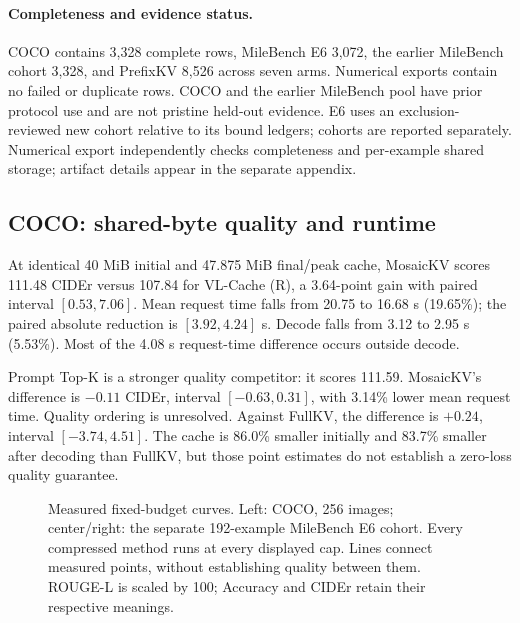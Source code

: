 \paragraph{Completeness and evidence status.}
COCO contains 3,328 complete rows, MileBench E6 3,072, the earlier MileBench
cohort 3,328, and PrefixKV 8,526 across seven arms. Numerical exports contain
no failed or duplicate rows. COCO and the earlier MileBench pool have prior
protocol use and are not pristine held-out evidence. E6 uses an
exclusion-reviewed new cohort relative to its bound ledgers; cohorts are
reported separately. Numerical export independently checks completeness and
per-example shared storage; artifact details appear in the separate appendix.

\subsection{COCO: shared-byte quality and runtime}
\begin{table}[t]
\caption{COCO at 40 MiB. Storage is MiB; times are seconds. FullKV is a
quality reference. R denotes a local reimplementation.}
\label{tab:coco-measured}
\centering\small\resizebox{\columnwidth}{!}{}
\end{table}

At identical 40 MiB initial and 47.875 MiB final/peak cache,
MosaicKV scores 111.48 CIDEr versus 107.84 for VL-Cache (R), a 3.64-point
gain with paired interval $[0.53,7.06]$. Mean request time falls from
20.75 to 16.68 s (19.65\%); the paired absolute reduction is
$[3.92,4.24]$ s. Decode falls from 3.12 to 2.95 s (5.53\%).
Most of the 4.08 s request-time difference occurs outside decode.

Prompt Top-K is a stronger quality competitor: it scores 111.59.
MosaicKV's difference is $-0.11$ CIDEr, interval $[-0.63,0.31]$, with
3.14\% lower mean request time. Quality ordering is unresolved.
Against FullKV, the difference is $+0.24$, interval $[-3.74,4.51]$.
The cache is 86.0\% smaller initially and 83.7\% smaller after decoding than
FullKV, but those point estimates do not establish a zero-loss quality guarantee.

\begin{figure}[t]
\centering
\caption{Measured fixed-budget curves. Left: COCO, 256 images; center/right:
the separate 192-example MileBench E6 cohort. Every compressed method runs at
every displayed cap. Lines connect measured points, without establishing
quality between them. ROUGE-L is scaled by 100; Accuracy and CIDEr retain
their respective meanings.}
\label{fig:curves}
\end{figure}

